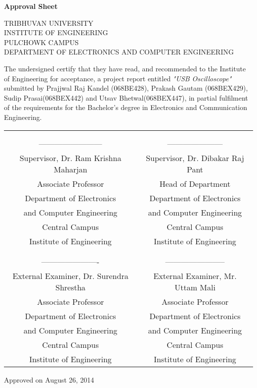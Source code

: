 
\begin{center}
	\begin{Large}
		\textbf{Approval Sheet}\\[1cm]
	\end{Large}
	\vfill
	TRIBHUVAN UNIVERSITY\\
	INSTITUTE OF ENGINEERING\\
	PULCHOWK CAMPUS\\
	DEPARTMENT OF ELECTRONICS AND COMPUTER ENGINEERING\\
\end{center}
The undersigned certify that they have read, and recommended to the Institute of Engineering for acceptance, a project report entitled \emph{"USB Oscilloscope"}  submitted by Prajjwal Raj Kandel (068BE428), Prakash Gautam (068BEX429), Sudip Prasai(068BEX442) and Utsav Bhetwal(068BEX447), in partial fulfilment of the requirements for the Bachelor’s degree in Electronics and Communication Engineering.


\begin{tabular}{c c}
{}&{}\\
{}&{}\\
------------------------ & ---------------------\\

Supervisor, Dr. Ram Krishna Maharjan \qquad & Supervisor, Dr. Dibakar Raj Pant \\
Associate Professor & Head of Department\\
Department of Electronics & Department of Electronics \\
and Computer Engineering & and Computer Engineering \\
Central Campus & Central Campus\\
Institute of Engineering & Institute of Engineering\\

{}&{}\\
{}&{}\\
---------------------- & -----------------------\\
External Examiner,  Dr.  Surendra  Shrestha & External Examiner,  Mr.  Uttam  Mali\\
Associate  Professor & Associate  Professor\\
Department of Electronics & Department of Electronics \\
and Computer Engineering & and Computer Engineering \\
Central Campus & Central Campus\\
Institute of Engineering & Institute of Engineering\\

\end{tabular}

\vfill
Approved on August 26, 2014
